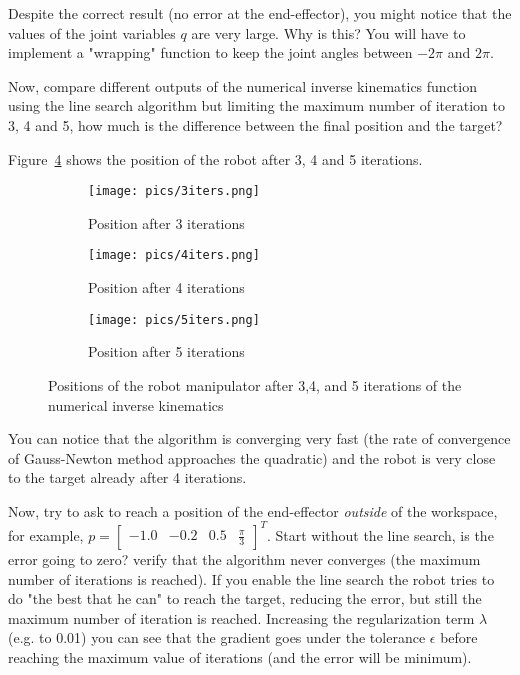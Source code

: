 \documentclass[11pt]{article}
\newcommand{\mat}[1]{\ensuremath{\begin{bmatrix}#1\end{bmatrix}}}	%
\begin{document}
Despite the correct result (no error at the end-effector), 
you might notice that the values of the joint variables $q$ are very large. Why is this? 
You will have to implement a "wrapping" function to keep the joint angles between $-2\pi$ and $2\pi$. 

 
Now,  compare different outputs of the numerical inverse kinematics function  using the line search algorithm but limiting the maximum number of iteration to 3, 4 and 5, how much is the difference between the final position and the target? 


Figure~\ref{fig:ik} shows the position of the robot after 3, 4 and 5 iterations.  
\begin{figure}[H]
	\centering
	\begin{subfigure}[b]{0.3\textwidth}
		\centering
		\texttt{[image: pics/3iters.png]}
		\caption{Position after 3 iterations}
		\label{fig:3it}
	\end{subfigure}
	\begin{subfigure}[b]{0.3\textwidth}
		\centering
		\texttt{[image: pics/4iters.png]}
		\caption{Position after 4 iterations}
		\label{fig:4it}
	\end{subfigure}
	\begin{subfigure}[b]{0.3\textwidth}
		\centering
		\texttt{[image: pics/5iters.png]}
		\caption{Position after 5 iterations}
		\label{fig:5it}			
	\end{subfigure}
	\caption{Positions of the robot manipulator after 3,4, and 5 iterations of the numerical inverse kinematics}
	\label{fig:ik}
\end{figure} 
 
You can notice that the algorithm is converging very fast (the rate of convergence of Gauss-Newton method approaches the quadratic) and the robot is very close to  the target already after 4 iterations. 
 
Now, try to ask to reach a position of the end-effector \textit{outside} of the workspace, for example, $p = \mat{	-1.0 & -0.2 & 0.5 & \frac{\pi}{3}}^T$. Start without the line search, is the error going to zero? verify that the algorithm never converges (the maximum number of iterations is reached). If you enable the line search the robot tries to do "the best that he can" to reach the target, reducing the error, but still the maximum number of iteration is reached. Increasing the regularization term $\lambda$ (e.g. to 0.01) you can see that the gradient goes under the tolerance $\epsilon$ before reaching the maximum value of iterations (and the error will be minimum).
\end{document}
